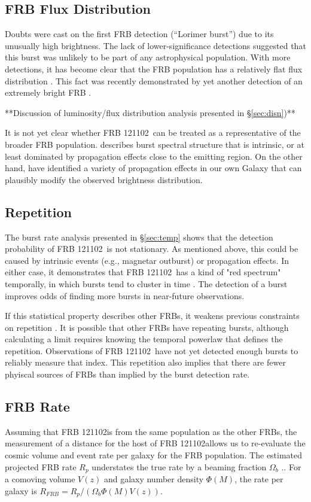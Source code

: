 \documentclass[twocolumn]{aastex61}
\newcommand{\frb}{FRB 121102}
\begin{document}
\subsection{FRB Flux Distribution}
Doubts were cast on the first FRB detection (``Lorimer burst'') due to its unusually high brightness. The lack of lower-significance detections suggested that this burst was unlikely to be part of any astrophysical population. With more detections, it has become clear that the FRB population has a relatively flat flux distribution \citep{2016ApJ...830...75V, 2016arXiv160206099L, 2016arXiv161100458L}. This fact was recently demonstrated by yet another detection of an extremely bright FRB \citep{2016arXiv161105758R}.

**Discussion of luminosity/flux distribution analysis presented in \S \ref{sec:disn})**

It is not yet clear whether \frb\ can be treated as a representative of the broader FRB population. \citet{2016Natur.531..202S} describes burst spectral structure that is intrinsic, or at least dominated by propagation effects close to the emitting region. On the other hand, \citep{CORDES} have identified a variety of propagation effects in our own Galaxy that can plausibly modify the observed brightness distribution.

\subsection{Repetition}
The burst rate analysis presented in \S \ref{sec:temp} shows that the detection probability of \frb\ is not stationary. As mentioned above, this could be caused by intrinsic events (e.g., magnetar outburst) or propagation effects. In either case, it demonstrates that \frb\ has a kind of "red spectrum" temporally, in which bursts tend to cluster in time \citep{2016MNRAS.458L..89C}. The detection of a burst improves odds of finding more bursts in near-future observations. 

If this statistical property describes other FRBs, it weakens previous constraints on repetition \citep{2015MNRAS.454..457P,2015ApJ...807...16L}. It is possible that other FRBs have repeating bursts, although calculating a limit requires knowing the temporal powerlaw that defines the repetition. Observations of \frb\ have not yet detected enough bursts to reliably measure that index. This repetition also implies that there are fewer phyiscal sources of FRBs than implied by the burst detection rate.

\subsection{FRB Rate}
Assuming that \frb is from the same population as the other FRBs, the measurement of a distance for the host of \frb allows us to re-evaluate the cosmic volume and event rate per galaxy for the FRB population. The estimated projected FRB rate $R_p$ understates the true rate by a beaming fraction $\Omega_b$ \citep[$\sim$10\%;][]{1998MNRAS.298..625T}.. For a comoving volume $V(z)$ and galaxy number density $\Phi(M)$, the rate per galaxy is $R_{FRB} = R_p /(\Omega_b \Phi(M)V (z))$. 
\end{document}
